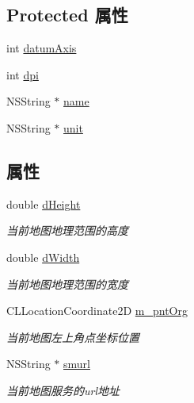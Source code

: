 \subsection*{Protected 属性}
\begin{DoxyCompactItemize}
\item 
int \hyperlink{interface_r_m_s_m_layer_info_ae59e4397d7cdc04e4d3a186cf7f8c19c}{datum\-Axis}
\item 
int \hyperlink{interface_r_m_s_m_layer_info_a4f0a8078ba4d84c1eab544e0667d0872}{dpi}
\item 
N\-S\-String $\ast$ \hyperlink{interface_r_m_s_m_layer_info_a440f798ca882b5d5772018e3ef0558bf}{name}
\item 
N\-S\-String $\ast$ \hyperlink{interface_r_m_s_m_layer_info_a7406807133af7ad0ce73440c382413f4}{unit}
\end{DoxyCompactItemize}
\subsection*{属性}
\begin{DoxyCompactItemize}
\item 
double \hyperlink{interface_r_m_s_m_layer_info_af25c14ce763ab15bff3a1fa972f336bb}{d\-Height}
\begin{DoxyCompactList}\small\item\em 当前地图地理范围的高度 \end{DoxyCompactList}\item 
double \hyperlink{interface_r_m_s_m_layer_info_a13807ccd8a6c9fbae7b6871c50e866cf}{d\-Width}
\begin{DoxyCompactList}\small\item\em 当前地图地理范围的宽度 \end{DoxyCompactList}\item 
C\-L\-Location\-Coordinate2\-D \hyperlink{interface_r_m_s_m_layer_info_ae5ab0f196f3230eb4799999fcf91a006}{m\-\_\-pnt\-Org}
\begin{DoxyCompactList}\small\item\em 当前地图左上角点坐标位置 \end{DoxyCompactList}\item 
N\-S\-String $\ast$ \hyperlink{interface_r_m_s_m_layer_info_ac4aefcf958b2ba03724dc84c1c667126}{smurl}
\begin{DoxyCompactList}\small\item\em 当前地图服务的url地址 \end{DoxyCompactList}\end{DoxyCompactItemize}


